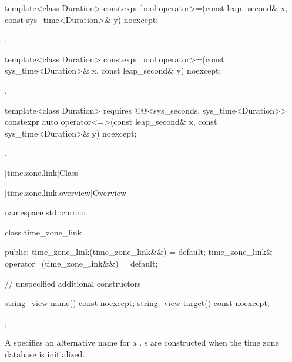 %
%
\begin{itemdecl}
template<class Duration>
  constexpr bool operator>=(const leap_second& x, const sys_time<Duration>& y) noexcept;
\end{itemdecl}

\begin{itemdescr}
\pnum
\returns
{}.
\end{itemdescr}

%
%
\begin{itemdecl}
template<class Duration>
  constexpr bool operator>=(const sys_time<Duration>& x, const leap_second& y) noexcept;
\end{itemdecl}

\begin{itemdescr}
\pnum
\returns
{}.
\end{itemdescr}

%
%
\begin{itemdecl}
template<class Duration>
  requires @@<sys_seconds, sys_time<Duration>>
  constexpr auto operator<=>(const leap_second& x, const sys_time<Duration>& y) noexcept;
\end{itemdecl}

\begin{itemdescr}
\pnum
\returns
{}.
\end{itemdescr}

[time.zone.link]{Class }

[time.zone.link.overview]{Overview}

\begin{codeblock}
namespace std::chrono {
  class time_zone_link {
  public:
    time_zone_link(time_zone_link&&)            = default;
    time_zone_link& operator=(time_zone_link&&) = default;

    // unspecified additional constructors

    string_view name()   const noexcept;
    string_view target() const noexcept;
  };
}
\end{codeblock}

\pnum
A  specifies an alternative name for a .
s are constructed when the time zone database is initialized.

